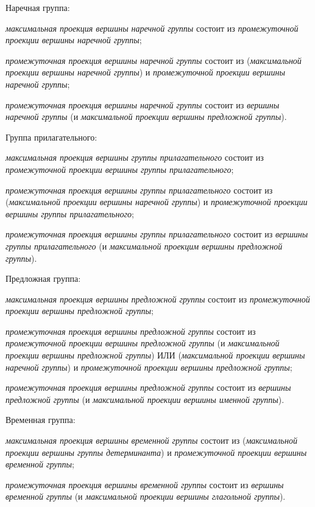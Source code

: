 Наречная группа:
\begin{textitemize}
    \item \textit{максимальная проекция вершины наречной группы} состоит из \textit{промежуточной проекции вершины наречной группы};
    \item \textit{промежуточная проекция вершины наречной группы} состоит из (\textit{максимальной проекции вершины наречной группы}) и \textit{промежуточной проекции вершины наречной группы};
    \item \textit{промежуточная проекция вершины наречной группы} состоит из \textit{вершины наречной группы} (и \textit{максимальной проекции вершины предложной группы}).
\end{textitemize}

Группа прилагательного:
\begin{textitemize}
    \item \textit{максимальная проекция вершины группы прилагательного} состоит из \textit{промежуточной проекции вершины группы прилагательного};
    \item \textit{промежуточная проекция вершины группы прилагательного} состоит из (\textit{максимальной проекции вершины наречной группы}) и \textit{промежуточной проекции вершины группы прилагательного};
    \item \textit{промежуточная проекция вершины группы прилагательного} состоит из \textit{вершины группы прилагательного} (и \textit{максимальной проекцим вершины предложной группы}).
\end{textitemize}

Предложная группа:
\begin{textitemize}
    \item \textit{максимальная проекция вершины предложной группы} состоит из \textit{промежуточной проекции вершины предложной группы};
    \item \textit{промежуточная проекция вершины предложной группы} состоит из \textit{промежуточной проекции вершины предложной группы} (и \textit{максимальной проекции вершины предложной группы}) ИЛИ (\textit{максимальной проекции вершины наречной группы}) и \textit{промежуточной проекции вершины предложной группы};
    \item \textit{промежуточная проекция вершины предложной группы} состоит из \textit{вершины предложной группы} (и \textit{максимальной проекции вершины именной группы}).
\end{textitemize}

Временная группа:
\begin{textitemize}
    \item \textit{максимальная проекция вершины временной группы} состоит из (\textit{максимальной проекции вершины группы детерминанта}) и \textit{промежуточной проекции вершины временной группы};
    \item \textit{промежуточная проекция вершины временной группы} состоит из \textit{вершины временной группы} (и \textit{максимальной проекции вершины глагольной группы}).
\end{textitemize}

